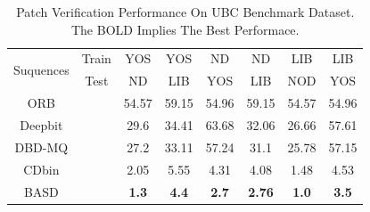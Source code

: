 \documentclass{svproc}
\begin{document}
\begin{table}[h]
\centering
\scriptsize
\caption{Patch Verification Performance On UBC Benchmark Dataset. The BOLD Implies The Best Performace.}
\label{table_example}
\begin{center}
\begin{tabular}{cccccccc}
\toprule
\midrule
\multirow{2}{*}{Suquences} & \multicolumn{1}{c}{Train} & \multicolumn{1}{c}{YOS} & \multicolumn{1}{c}{YOS}  & \multicolumn{1}{c}{ND}  & \multicolumn{1}{c}{ND}  & \multicolumn{1}{c}{LIB}   & \multicolumn{1}{c}{LIB}  \\
  \cline{3-8}
                           & \multicolumn{1}{c}{Test} & \multicolumn{1}{c}{ND} & \multicolumn{1}{c}{LIB}  & \multicolumn{1}{c}{YOS}  & \multicolumn{1}{c}{LIB}  & \multicolumn{1}{c}{NOD}   & \multicolumn{1}{c}{YOS}  \\
  \cline{3-8}


\multirow{1}{*}{ORB}   & \multicolumn{1}{c}{} & \multicolumn{1}{c}{54.57} & \multicolumn{1}{c}{59.15} & \multicolumn{1}{c}{54.96}  & \multicolumn{1}{c}{59.15}  & \multicolumn{1}{c}{54.57}  & \multicolumn{1}{c}{54.96}  \\
  \cline{3-8}
\multirow{1}{*}{Deepbit} & \multicolumn{1}{c}{}  & \multicolumn{1}{c}{29.6} & \multicolumn{1}{c}{34.41} & \multicolumn{1}{c}{63.68}  & \multicolumn{1}{c}{32.06}  & \multicolumn{1}{c}{26.66}  & \multicolumn{1}{c}{57.61}  \\
  \cline{3-8}
\multirow{1}{*}{DBD-MQ}   & \multicolumn{1}{c}{}  & \multicolumn{1}{c}{27.2} & \multicolumn{1}{c}{33.11} & \multicolumn{1}{c}{57.24}  & \multicolumn{1}{c}{31.1}  & \multicolumn{1}{c}{25.78}  & \multicolumn{1}{c}{57.15}  \\
  \cline{3-8}
\multirow{1}{*}{CDbin}   & \multicolumn{1}{c}{}  & \multicolumn{1}{c}{2.05} & \multicolumn{1}{c}{5.55} & \multicolumn{1}{c}{4.31}  & \multicolumn{1}{c}{4.08}  & \multicolumn{1}{c}{1.48}  & \multicolumn{1}{c}{4.53}  \\
  \cline{3-8}
\multirow{1}{*}{BASD}  & \multicolumn{1}{c}{}  & \multicolumn{1}{c}{\textbf{1.3}} & \multicolumn{1}{c}{\textbf{4.4}} & \multicolumn{1}{c}{\textbf{2.7}}  & \multicolumn{1}{c}{\textbf{2.76}}  & \multicolumn{1}{c}{\textbf{1.0}}  & \multicolumn{1}{c}{\textbf{3.5}}  \\
\midrule
\toprule
\end{tabular} 
\end{center}
\end{table}
\vspace{-0.47cm}
\end{document}

